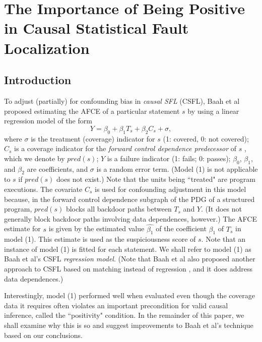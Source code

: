 \chapter{The Importance of Being Positive 
in Causal Statistical Fault Localization}\label{chap:importance}

\section{Introduction}\label{sec1}
To adjust (partially) for confounding bias in {\it causal SFL} (CSFL), Baah et al proposed estimating the AFCE of a particular statement $s$ by using a linear regression model of the form
\begin{equation}\label{eq1}
Y=\beta_0+\beta_1T_s+\beta_2C_s+\sigma,
\end{equation}
where $\sigma$ is the treatment (coverage) indicator for $s$ (1: covered, 0: not covered); $C_s$ is a coverage indicator for the {\it forward control dependence predecessor} of $s$ \cite{ball1993s}, which we denote by $pred(s)$; $Y$ is a failure indicator (1: fails; 0: passes); $\beta_0$, $\beta_1$, and $\beta_2$ are coefficients, and $\sigma$ is a random error term.  (Model (1) is not applicable to $s$ if $pred(s)$ does not exist.)  Note that the units being ``treated" are program executions.  The covariate $C_s$ is used for confounding adjustment in this model because, in the forward control dependence subgraph of the PDG of a structured program, $pred(s)$ blocks all backdoor paths between $T_s$ and $Y$.  (It does not generally block backdoor paths involving data dependences, however.)  The AFCE estimate for $s$ is given by the estimated value $\widehat{\beta_1}$ of the coefficient $\beta_1$ of $T_s$ in model (1).  This estimate is used as the suspiciousness score of $s$.  Note that an instance of model (1) is fitted for each statement.  We shall refer to model (1) as Baah et al’s CSFL {\it regression model}.  (Note that Baah et al also proposed another approach to CSFL based on matching instead of regression \cite{baah2011mitigating}, and it does address data dependences.)

Interestingly, model (1) performed well when evaluated \cite{baah2010causal} even though the coverage data it requires often violates an important precondition for valid causal inference, called the ``positivity" condition.  In the remainder of this paper, we shall examine why this is so and suggest improvements to Baah et al’s technique based on our conclusions.

